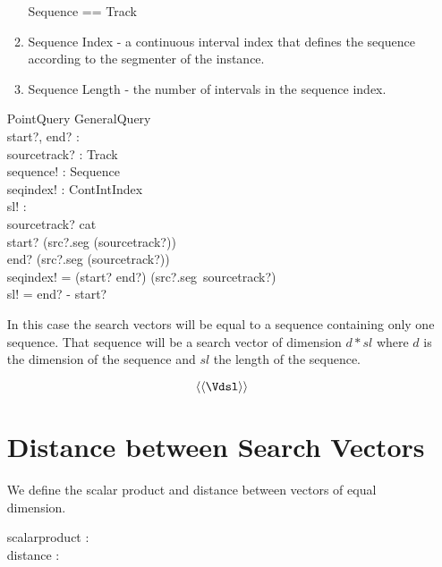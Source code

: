 \documentclass[11pt]{article}
\begin{document}
\begin{enumerate}
\begin{enumerate}
\begin{zed}
	Sequence == Track
\end{zed}

\item \textsf{Sequence Index} - a continuous interval index that defines the sequence according to the segmenter of the instance. 


\item \textsf{Sequence Length} - the number of  intervals in the sequence index.

\end{enumerate}

\begin{schema}{PointQuery}
	GeneralQuery \\
	start?, end? :  \nat \\
	sourcetrack? : Track \\
	sequence! : Sequence \\
      	seqindex! : ContIntIndex \\
	sl! : \nat \\
\where
	sourcetrack? \in \ran cat \\
	start? \in \dom (src?.seg (sourcetrack?)) \\ 
	end? \in \dom (src?.seg (sourcetrack?)) \\ 
	seqindex! =  (start? \upto end?) \dres (src?.seg~sourcetrack?)   \\
	sl! = end? - start? \\
\end{schema}

In this case the search vectors will be equal to a sequence containing only one sequence. That sequence will be a search vector of dimension $d * sl$ where $d$ is the dimension of the sequence and $sl$ the length of the sequence. 

\[  \langle \langle \Vdsl \rangle \rangle \]

\section{Distance between Search Vectors}	

We define the scalar product and distance between vectors of equal dimension. 

\begin{axdef}
	scalarproduct : \V \fun \V \fun \R \\
	distance : \V \fun \V \fun \R \\
\end{axdef}


\end{enumerate}
\end{document}
